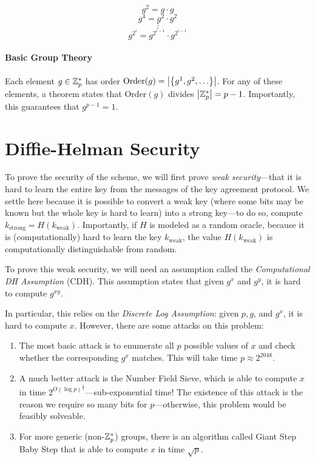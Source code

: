 \[ g^2 = g\cdot g \] \[ g^4 = g^2 \cdot g^2 \]  \[ \vdots \] \[ g^2^i = g^2^{i-1} \cdot g^2^{i-1} \]

\paragraph{Basic Group Theory}
Each element $g \in \mathbb{Z}_p^*$ has order $\text{Order}(g) = \left| \left\{ g^1, g^2, \ldots  \right\} \right|$. For any of these elements, a theorem states that $\text{Order}(g)$ divides $\left| \mathbb{Z}_p^* \right| = p-1$. Importantly, this guarantees that $g^{p-1} = 1$.

\section{Diffie-Helman Security}
To prove the security of the scheme, we will first prove \emph{weak security}---that it is hard to learn the entire key from the messages of the key agreement protocol. We settle here because it is possible to convert a weak key (where some bits may be known but the whole key is hard to learn) into a strong key---to do so, compute $k_\text{strong} = H(k_\text{weak})$. Importantly, if $H$ is modeled as a random oracle, because it is (computationally) hard to learn the key $k_\text{weak}$, the value $H(k_\text{weak})$ is computationally distinguishable from random.

To prove this weak security, we will need an assumption called the \emph{Computational DH Assumption} (CDH). This assumption states that given $g^x$ and $g^y$, it is hard to compute $g^{xy}$.

In particular, this relies on the \emph{Discrete Log Assumption}: given $p, g$, and $g^x$, it is hard to compute $x$. However, there are some attacks on this problem:

\begin{enumerate}
	\item The most basic attack is to enumerate all $p$ possible values of $x$ and check whether the corresponding $g^x$ matches. This will take time $p \approx 2^{2048}$.
	\item A much better attack is the Number Field Sieve, which is able to compute $x$ in time $2^{O(\log p)^{\frac{1}{3}}}$---sub-exponential time! The existence of this attack is the reason we require so many bits for $p$---otherwise, this problem would be feasibly solveable.
	\item For more generic (non-$\mathbb{Z}_p^*$) groups, there is an algorithm called Giant Step Baby Step that is able to compute $x$ in time $\sqrt{p}$.
\end{enumerate}

